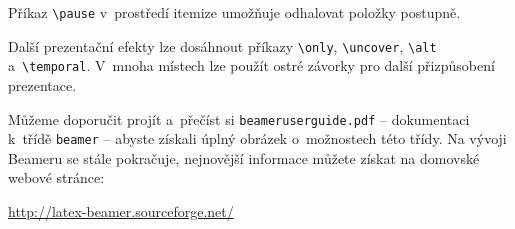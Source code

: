 Příkaz \verb|\pause| v~prostředí itemize umožňuje odhalovat položky
postupně. 

Další prezentační efekty lze dosáhnout příkazy
\verb|\only|, \verb|\uncover|, \verb|\alt| a~\verb|\temporal|.
V~mnoha místech lze použít ostré závorky pro další přizpůsobení
prezentace.

Můžeme doporučit projít a~přečíst si \texttt{beameruserguide.pdf} --
dokumentaci k~třídě \verb+beamer+ -- abyste získali úplný obrázek o~možnostech této třídy.
Na vývoji Beameru se stále pokračuje, nejnovější informace můžete získat
na domovské webové stránce:\par
\url{http://latex-beamer.sourceforge.net/}

